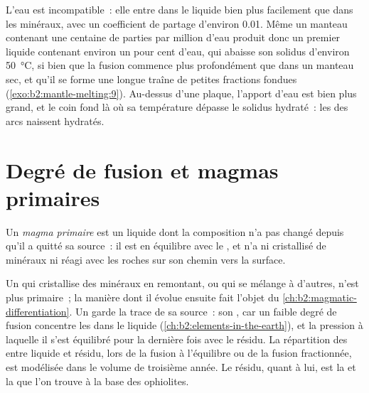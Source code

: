 L'eau est incompatible~: elle entre dans le liquide bien plus facilement que dans les minéraux,
avec un coefficient de partage d'environ 0.01. Même un manteau contenant une centaine de
parties par million d'eau produit donc un premier liquide contenant environ un pour cent d'eau, qui
abaisse son solidus d'environ \qty{50}{\celsius}, si bien que la fusion
commence plus profondément que dans un manteau sec, et qu'il se forme une longue traîne de petites
fractions fondues (\cref{exo:b2:mantle-melting:9}). Au-dessus d'une plaque, l'apport d'eau est bien plus
grand, et le coin fond là où sa température dépasse le solidus hydraté~: les  des arcs naissent
hydratés.

\section{Degré de fusion et magmas primaires}\label{sec:b2:mantle-melting:primary}

\begin{definition}\label{def:b2:mantle-melting:primary}
Un \emph{magma primaire} est un liquide dont la composition n'a pas
changé depuis qu'il a quitté sa source~: il est en équilibre avec le ,
et n'a ni cristallisé de minéraux ni réagi avec les roches sur son chemin vers la surface.
\end{definition}

Un  qui cristallise des minéraux en remontant, ou qui se mélange à d'autres, n'est plus
primaire~; la manière dont il évolue ensuite fait l'objet du
\cref{ch:b2:magmatic-differentiation}. Un  garde la trace de sa source~: son
, car un faible degré de fusion concentre les 
dans le liquide (\cref{ch:b2:elements-in-the-earth}), et la pression à laquelle il s'est
équilibré pour la dernière fois avec le résidu. La répartition des  entre
liquide et résidu, lors de la fusion à l'équilibre ou de la fusion fractionnée, est modélisée dans le volume de troisième année. Le
résidu, quant à lui, est la  et la  que l'on trouve à la base des
ophiolites.

